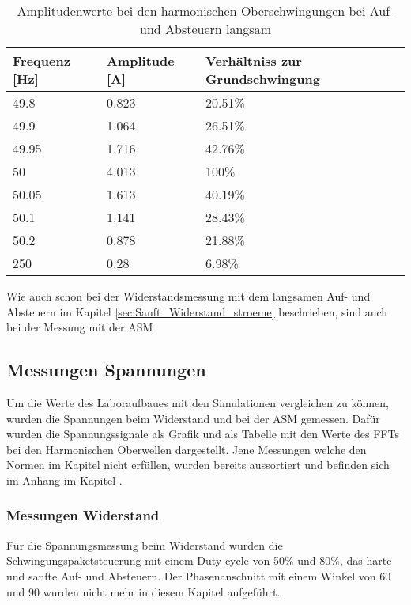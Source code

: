 \begin{table}[ht!]
	\centering
	\begin{tabular}{|l|l|l|}
		\hline
		Frequenz {[}Hz{]} & Amplitude {[}A{]} & Verhältniss zur Grundschwingung	\\ \hline
		49.8              & 0.823             & 20.51\%							\\ \hline
		49.9              & 1.064             & 26.51\%							\\ \hline
		49.95             & 1.716             & 42.76\%							\\ \hline
		50                & 4.013             & 100\%							\\ \hline
		50.05             & 1.613             & 40.19\%							\\ \hline
		50.1              & 1.141             & 28.43\%							\\ \hline
		50.2              & 0.878             & 21.88\%							\\ \hline
		250               & 0.28              & 6.98\%							\\ \hline
	\end{tabular}
	\caption{Amplitudenwerte bei den harmonischen Oberschwingungen bei Auf- und Absteuern langsam}\label{tab:Sanft_langsam_ASM_stroeme}
\end{table}
Wie auch schon bei der Widerstandsmessung mit dem langsamen Auf- und Absteuern im Kapitel \ref{sec:Sanft_Widerstand_stroeme} beschrieben, sind auch bei der Messung mit der ASM 

\newpage
\subsection{Messungen Spannungen}
Um die Werte des Laboraufbaues mit den Simulationen vergleichen zu können, wurden die Spannungen beim Widerstand und bei der ASM gemessen. Dafür wurden die Spannungssignale als Grafik und als Tabelle mit den Werte des FFTs bei den Harmonischen Oberwellen dargestellt. Jene Messungen welche den Normen im Kapitel  nicht erfüllen, wurden bereits aussortiert und befinden sich im Anhang im Kapitel .

\subsubsection{Messungen Widerstand}
Für die Spannungsmessung beim Widerstand wurden die Schwingungspaketsteuerung mit einem Duty-cycle von 50\% und 80\%, das harte und sanfte Auf- und Absteuern. Der Phasenanschnitt mit einem Winkel von 60\textdegree \hspace{0.02cm} und 90\textdegree \hspace{0.02cm} wurden nicht mehr in diesem Kapitel aufgeführt.


